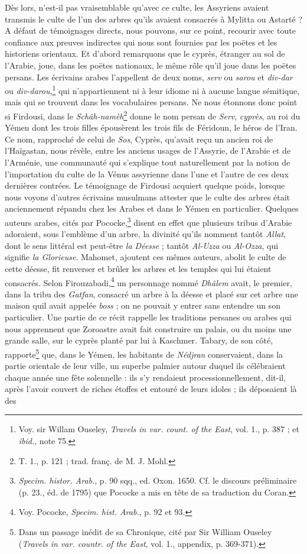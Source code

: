 \documentclass[a4paper, 11pt, oneside, polutonikogreek, french]{article}
\begin{document}
Dès lors, n'est-il pas vraisemblable qu'avec ce culte, les Assyriens avaient transmis le culte de l'un des arbres qu'ils avaient consacrés à Mylitta ou Astarté ? A défaut de témoignages directs, nous pouvons, sur ce point, recourir avec toute confiance aux preuves indirectes qui nous sont fournies par les poëtes et les historiens orientaux. Et d'abord remarquons que le cyprès, étranger au sol de l'Arabie, joue, dans les poëtes nationaux, le même rôle qu'il joue dans les poëtes persans. Les écrivains arabes l'appellent de deux noms, \emph{serv} ou \emph{sarou} et \emph{div-dar} ou \emph{div-darou},\footnote{Voy. sir Willam Ouseley, \emph{Travels in var. count. of the East}, vol. 1., p. 387 ; et \emph{ibid.}, note 75.} qui n'appartiennent ni à leur idiome ni à aucune langue sémitique, mais qui se trouvent dans les vocabulaires persans. Ne nous étonnons donc point si Firdousi, dans le \emph{Schâh-namèh}\footnote{T. 1., p. 121 ; trad. franç. de M. J. Mohl.} donne le nom persan de \emph{Serv}, \emph{cyprès}, au roi du Yémen dont les trois filles épousèrent les trois fils de Féridoun, le héros de l'Iran. Ce nom, rapproché de celui de \emph{Sos}, Cyprès, qu'avait reçu un ancien roi de l'Haïgastan, nous révèle, entre les anciens usages de l'Assyrie, de l'Arabie et de l'Arménie, une communauté qui s'explique tout naturellement par la notion de l'importation du culte de la Vénus assyrienne dans l'une et l'autre de ces deux dernières contrées. Le témoignage de Firdousi acquiert quelque poids, lorsque nous voyons d'autres écrivains musulmans attester que le culte des arbres était anciennement répandu chez les Arabes et dans le Yémen en particulier. Quelques auteurs arabes, cités par Pococke,\footnote{\emph{Specim. histor. Arab.}, p. 90 sqq., ed. Oxon. 1650. Cf. le discours préliminaire (p. 23., éd. de 1795) que Pococke a mis en tête de sa traduction du Coran.} disent en effet que plusieurs tribus d'Arabie adoraient, sous l'emblème d'un arbre, la divinité qu'ils nomment tantôt \emph{Allat}, dont le sens littéral est peut-être \emph{la Déesse} ; tantôt \emph{Al-Uzza} ou \emph{Al-Ozza}, qui signifie \emph{la Glorieuse}. Mahomet, ajoutent ces mêmes auteurs, abolit le culte de cette déesse, fit renverser et brûler les arbres et les temples qui lui étaient consacrés. Selon Firouzabadi,\footnote{Voy. Pococke, \emph{Specim. hist. Arab.}, p. 92 et 93.} un personnage nommé \emph{Dhâlem} avait, le premier, dans la tribu des \emph{Gatfan}, consacré un arbre à la déesse et placé sur cet arbre une maison quil avait appelée \emph{boss} ; on ne pouvait y entrer sans entendre un son particulier. Une partie de ce récit rappelle les traditions persanes ou arabes qui nous apprennent que Zoroastre avait fait construire un palais, ou du moins une grande salle, sur le cyprès planté par lui à Kaschmer. Tabary, de son côté, rapporte\footnote{Dans un passage inédit de sa Chronique, cité par Sir William Ouseley (\emph{Travels in var. countr. of the East}, vol. 1., appendix, p. 369-371).} que, dans le Yémen, les habitants de \emph{Nédjran} conservaient, dans la partie orientale de leur ville, un superbe palmier autour duquel ils célébraient chaque année une fête solennelle : ils s'y rendaient processionnellement, dit-il, après l'avoir couvert de riches étoffes et entouré de leurs idoles ; ils déposaient là des 
\end{document}
